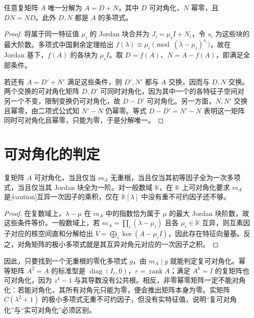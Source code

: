 \begin{theorem}
\label{thm:xie-ex-sim-jc}
任意复矩阵 $A$ 唯一分解为 $A=D+N$，其中 $D$ 可对角化，$N$ 幂零，且 $DN=ND$。此外 $D,N$ 都是 $A$ 的多项式。
\end{theorem}
\begin{proof}
将属于同一特征值 $\mu_i$ 的 Jordan 块合并为 $J_i=\mu_iI+N_i$，令 $s_i$ 为这些块的最大阶数。多项式中国剩余定理给出 $f(\lambda)\equiv\mu_i\pmod{(\lambda-\mu_i)^{s_i}}$，故在 Jordan 基下，$f(A)$ 的各块为 $\mu_iI$。取 $D=f(A)$、$N=A-f(A)$，即满足全部条件。

若还有 $A=D'+N'$ 满足这些条件，则 $D',N'$ 都与 $A$ 交换，因而与 $D,N$ 交换。两个交换的可对角化矩阵 $D,D'$ 可同时对角化，因为其中一个的各特征子空间对另一个不变，限制变换仍可对角化，故 $D-D'$ 可对角化。另一方面，$N,N'$ 交换且幂零，由二项式公式知 $N'-N$ 仍幂零。等式 $D-D'=N'-N$ 表明这一矩阵同时可对角化且幂零，只能为零，于是分解唯一。
\end{proof}

\section{可对角化的判定}
\label{sec:xie-ex-sim-diagonalizable}

\begin{theorem}
\label{thm:xie-ex-sim-diagonalizable}
复矩阵 $A$ 可对角化，当且仅当 $m_A$ 无重根，当且仅当其初等因子全为一次多项式，当且仅当其 Jordan 块全为一阶。对一般数域 $\mathbb K$，在 $\mathbb K$ 上可对角化要求 $m_A$ 是\emph[caution]{互异一次因子的乘积}，仅在 $\mathbb K[\lambda]$ 中没有重不可约因子还不够。
\end{theorem}
\begin{proof}
在复数域上，$\lambda-\mu$ 在 $m_A$ 中的指数恰为属于 $\mu$ 的最大 Jordan 块阶数，故这些条件等价。一般数域上，若 $m_A=\prod_i(\lambda-\mu_i)$ 且各 $\mu_i\in\mathbb K$ 互异，则互素因子对应的核空间直和分解给出 $V=\bigoplus_i\ker(A-\mu_iI)$，因此存在特征向量基。反之，对角矩阵的极小多项式就是其互异对角元对应的一次因子之积。
\end{proof}

因此，只要找到一个无重根的零化多项式 $g$，由 $m_A\mid g$ 就能判定复可对角化。幂等矩阵 $A^2=A$ 的标准型是 $\operatorname{diag}(I_r,0)$，$r=\operatorname{rank}A$；满足 $A^k=I$ 的复矩阵也可对角化，因为 $z^k-1$ 与其导数没有公共根。相反，非零幂零矩阵一定不能对角化：若能对角化，其所有对角元只能为零，便会推出矩阵本身为零。实矩阵 $C(\lambda^2+1)$ 的极小多项式无重不可约因子，但没有实特征值，说明“复可对角化”与“实可对角化”必须区别。

